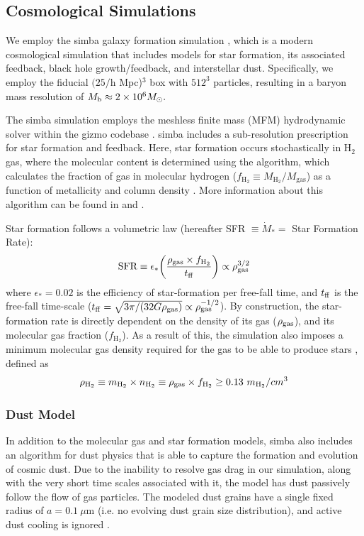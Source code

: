 \documentclass[twocolumn, linenumbers]{aastex631}
\newcommand{\hh}{\text{H}_2}
\newcommand{\fhh}{f_{\text{H}_2}}
\newcommand{\mhh}{M_{\text{H}_2}}
\newcommand{\mgas}{M_{\text{gas}}}
\newcommand{\sfr}{\text{SFR}}
\newcommand{\simba}[0]{{\sc simba} }
\newcommand{\gizmo}[0]{{\sc gizmo} }
\begin{document}
\subsection{Cosmological Simulations}
\label{ssec:simba}

We employ the \simba galaxy formation simulation \citep{simba}, which is a modern cosmological simulation that includes models for star formation, its associated feedback, black hole growth/feedback, and interstellar dust.  Specifically, we employ the fiducial $(25/$h Mpc)$^3$ box with $512^3$ particles, resulting in a baryon mass resolution of $M_{\rm b} \approx 2\times10^6 M_\odot.$   

The \simba simulation employs the meshless finite mass (MFM) hydrodynamic solver within the \gizmo codebase \citep{hopkins15,hopkins17}.  \simba includes a sub-resolution prescription for star formation and feedback.  Here, star formation occurs stochastically in H$_2$ gas, where the molecular content is determined using the \citet*{KMT07} algorithm, which calculates the fraction of gas in molecular hydrogen ($f_{\hh}\equiv \mhh/\mgas$) as a function of metallicity and column density \citep{mufasa}.  More information about this algorithm can be found in \cite{KMT11} and \cite{thompson}.

Star formation follows a volumetric \citet{shmidt} law (hereafter SFR $\equiv\dot{M}_*=$ Star Formation Rate): 
\begin{equation}
\sfr\equiv \epsilon_*\bigg(\frac{\rho_{\rm gas}\times  \fhh}{t_{\rm ff}}\bigg)\propto \rho_{\rm gas}^{3/2}
\label{eq:sfr}
\end{equation}
where $\epsilon_*=0.02$ is the efficiency of star-formation per free-fall time, and $t_{\rm ff}$ is the free-fall time-scale ($t_{\rm ff}=\sqrt{3\pi/(32G\rho_{\rm gas})} \propto \rho_{\rm gas}^{-1/2}$).  By construction, the star-formation rate is directly dependent on the density of its gas ($\rho_{\rm gas}$), and its molecular gas fraction ($\fhh$).  As a result of this, the simulation also imposes a minimum molecular gas density required for the gas to be able to produce stars \citep{mufasa}, defined as
\begin{equation}\rho_{\hh}\equiv m_{\hh}\times n_{\hh}\equiv \rho_{\rm gas}\times f_{\hh}\geq 0.13\ m_{\hh}/cm^3\label{eq:minDen}\end{equation}

\subsubsection{Dust Model}
\label{sssec:dust}
In addition to the molecular gas and star formation models, \simba also includes an algorithm for dust physics that is able to capture the formation and evolution of cosmic dust.  Due to the inability to resolve gas drag in our simulation, along with the very short time scales associated with it, the model has dust passively follow the flow of gas particles. The modeled dust grains have a single fixed radius of $a=0.1~\mu \text{m}$ (i.e. no evolving dust grain size distribution), and active dust cooling is ignored \citep{simba}.
\end{document}
